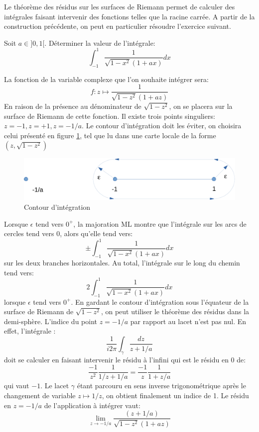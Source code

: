 Le théorème des résidus sur les surfaces de Riemann permet de calculer des intégrales faisant intervenir des fonctions telles que la racine carrée. A partir de la construction précédente, on peut en particulier résoudre l'exercice suivant.
\begin{exercice}
Soit $a \in ]0,1[$. Déterminer la valeur de l'intégrale:
\[
\int_{-1}^1 \frac{1}{\sqrt{1-x^2}(1+ax)} dx
\]
\end{exercice}
La fonction de la variable complexe que l'on souhaite intégrer sera:
\[
f \colon z \mapsto \frac{1}{\sqrt{1-z^2}(1+az)}
\]
En raison de la présence au dénominateur de $\sqrt{1-z^2}$, on se placera sur la surface de Riemann de cette fonction. Il existe trois points singuliers: $z=-1, z=+1, z=-1/a$. Le contour d'intégration doit les éviter, on choisira celui présenté en figure \ref{fig:contour_riemann}, tel que lu dans une carte locale de la forme $(z,\sqrt{1-z^2})$
\begin{figure}[h!]
    \centering
    \includegraphics[scale=0.4]{images/contour_riemann.pdf}
    \caption{Contour d'intégration}
    \label{fig:contour_riemann}
\end{figure}
Lorsque $\epsilon$ tend vers $0^+$, la majoration ML montre que l'intégrale sur les arcs de cercles tend vers 0, alors qu'elle tend vers:
\[
\pm \int_{-1}^1 \frac{1}{\sqrt{1-x^2}(1+ax)} dx
\]
sur les deux branches horizontales. Au total, l'intégrale sur le long
du chemin tend vers:
\[
2 \int_{-1}^1 \frac{1}{\sqrt{1-x^2}(1+ax)} dx
\]
lorsque $\epsilon$ tend vers $0^+$.
En gardant le contour d'intégration sous l'équateur de la surface de Riemann de $\sqrt{1-z^2}$, on peut utiliser le théorème des résidus dans la demi-sphère. L'indice du point $z=-1/a$ par rapport au lacet n'est pas nul. En effet, l'intégrale :
\[
\frac{1}{i2\pi}\int_{\gamma}\frac{dz}{z+1/a} 
\]
doit se calculer en faisant intervenir le résidu à l'infini qui est le résidu en 0 de:
\[
\frac{-1}{z^2}\frac{1}{1/z +1/a} = \frac{-1}{z}\frac{1}{1+z/a}
\]
qui vaut $-1$.
Le lacet $\gamma$ étant parcouru en sens inverse trigonométrique après le changement de variable $z \mapsto 1/z$, on obtient finalement un indice de 1. 
Le résidu en $z=-1/a$ de l'application à intégrer vaut:
\[
\lim_{z \to -1/a} \frac{(z+1/a)}{\sqrt{1-z^2}(1+az)}
\]
